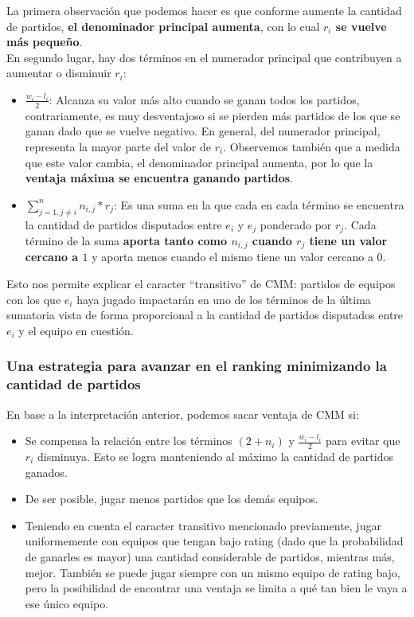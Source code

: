 La primera observación que podemos hacer es que conforme aumente la cantidad de partidos, \textbf{el denominador principal aumenta}, con lo cual \textbf{$r_i$ se vuelve más pequeño}.\\

En segundo lugar, hay dos términos en el numerador principal que contribuyen a aumentar o disminuir $r_i$:

\begin{itemize}
    \item $\frac{w_i - l_i}{2}$: Alcanza su valor más alto cuando se ganan todos los partidos, contrariamente, es muy desventajoso si se pierden más partidos de los que se ganan dado que se vuelve negativo. En general, del numerador principal, representa la mayor parte del valor de $r_i$. Observemos también que a medida que este valor cambia, el denominador principal aumenta, por lo que la \textbf{ventaja máxima se encuentra ganando partidos}.
    \item $\sum_{j=1, j \neq i}^{n}{n_{i,j} * r_j}$: Es una suma en la que cada en cada término se encuentra la cantidad de partidos disputados entre $e_i$ y $e_j$ ponderado por $r_j$. Cada término de la suma \textbf{aporta tanto como $n_{i, j}$ cuando $r_j$ tiene un valor cercano a $1$} y aporta menos cuando el mismo tiene un valor cercano a $0$.
\end{itemize}

\newpage
Esto nos permite explicar el caracter ``transitivo'' de CMM: partidos de equipos con los que $e_i$ haya jugado impactarán en uno de los términos de la última sumatoria vista de forma proporcional a la cantidad de partidos disputados entre $e_i$ y el equipo en cuestión.

\subsubsection{Una estrategia para avanzar en el ranking minimizando la cantidad de partidos}

En base a la interpretación anterior, podemos sacar ventaja de CMM si:

\begin{itemize}
    \item Se compensa la relación entre los términos $(2 + n_i)$ y $\frac{w_i - l_i}{2}$ para evitar que $r_i$ disminuya. Esto se logra manteniendo al máximo la cantidad de partidos ganados.
    \item De ser posible, jugar menos partidos que los demás equipos.
    \item Teniendo en cuenta el caracter transitivo mencionado previamente, jugar uniformemente con equipos que tengan bajo rating (dado que la probabilidad de ganarles es mayor) una cantidad considerable de partidos, mientras más, mejor. También se puede jugar siempre con un mismo equipo de rating bajo, pero la posibilidad de encontrar una ventaja se limita a qué tan bien le vaya a ese único equipo.
\end{itemize}

